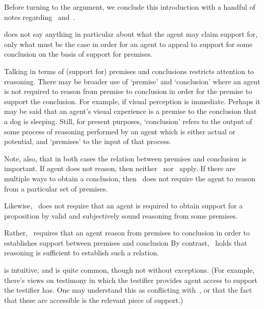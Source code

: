 \begin{note}
  Before turning to the argument, we conclude this introduction with a handful of notes regarding~\uRa{} and~\rC{}.
\end{note}

\begin{note}
  \uRa{} does not say anything in particular about what the agent may claim support for, only what must be the case in order for an agent to appeal to support for some conclusion on the basis of support for premises.

  Talking in terms of (support for) premises and conclusions restricts attention to reasoning.
  There may be broader use of `premise' and `conclusion' where an agent is not required to reason from premise to conclusion in order for the premise to support the conclusion.
  For example, if visual perception is immediate.
  Perhaps it may be said that an agent's visual experience is a premise to the conclusion that a dog is sleeping.
  Still, for present purposes, `conclusion' refers to the output of some process of reasoning performed by an agent which is either actual or potential, and `premises' to the input of that process.

  Note, also, that in both cases the relation between premises and conclusion is important.
  If agent does not reason, then neither~\bP{} nor~\uRa{} apply.
  If there are multiple ways to obtain a conclusion, then~\uRa{} does not require the agent to reason from a particular set of premises.

  Likewise,~\uRa{} does not require that an agent is required to obtain support for a proposition by valid and subjectively sound reasoning from some premises.

  Rather,~\uRa{} requires that an agent reason from premises to conclusion in order to establishes support between premises and conclusion
  By contrast,~\bP{} holds that reasoning is sufficient to establish such a relation.
\end{note}

\begin{note}
  \uRa{} is intuitive, and is quite common, though not without exceptions.
(For example, there's views on testimony in which the testifier provides agent access to support the testifier has.
One may understand this as conflicting with~\uRa{}, or that the fact that these are accessible is the relevant piece of support.)
\end{note}

